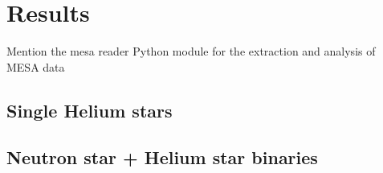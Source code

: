 \documentclass[../../main/thesis_msc.tex]{subfiles}
\begin{document}
	\chapter{Results}
	
		Mention the mesa reader Python module for the extraction and analysis of MESA data
		
			\section{Single Helium stars}
			
			
			
			\section{Neutron star + Helium star binaries}
\end{document}
